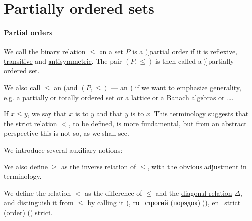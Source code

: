 \section{Partially ordered sets}\label{sec:partially_ordered_sets}

\paragraph{Partial orders}

\begin{definition}\label{def:partially_ordered_set}
  We call the \hyperref[def:binary_relation]{binary relation} \( \leq \) on a \hyperref[def:set]{set} \( P \) is a \term[ru=частичный порядок (\cite[def. 3.2]{Гуров2013ТеорияРешёток})]{partial order} if it is \hyperref[def:binary_relation/reflexive]{reflexive}, \hyperref[def:binary_relation/transitive]{transitive} and \hyperref[def:binary_relation/antisymmetric]{antisymmetric}. The pair \( (P, \leq) \) is then called a \term[ru=часточно упорядоченное множество (\cite[def. 3.3]{Гуров2013ТеорияРешёток})]{partially ordered set}.

  We also call \( {\leq} \) an  (and \( (P, \leq) \) --- an ) if we want to emphasize generality, e.g. a partially or \hyperref[def:totally_ordered_set]{totally ordered set} or a \hyperref[def:lattice]{lattice} or a \hyperref[def:banach_algebra]{Banach algebras} or \ldots.

  If \( x \leq y \), we say that \( x \) is  to \( y \) and that \( y \) is  to \( x \). This terminology suggests that the strict relation \( {<} \), to be defined, is more fundamental, but from an abstract perspective this is not so, as we shall see.

  We introduce several auxiliary notions:
  \begin{thmenum}[series=def:partially_ordered_set]
     We also define \( \geq \) as the \hyperref[def:binary_relation/inverse]{inverse relation} of \( \leq \), with the obvious adjustment in terminology.

     We define the relation \( {<} \) as the difference of \( {\leq} \) and the \hyperref[def:binary_relation/diagonal]{diagonal relation} \( \Delta \), and distinguish it from \( {\leq} \) by calling it \term[bg=строго (неравенство) (\cite[10]{Проданов1982ФункционаленАнализЧаст1}), ru=строгий (порядок) (\cite[74]{Гуров2013ТеорияРешёток}), en=strict (order) (\cite[\S 1.1.3.2]{Harzheim2005OrderedSets})]{strict}.


\end{thmenum}
\end{definition}
